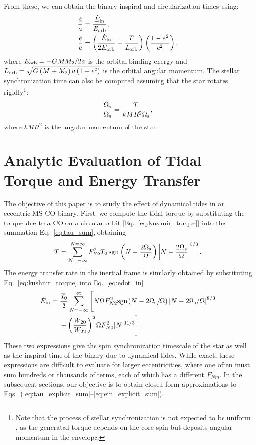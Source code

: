 \documentclass[
        fleqn,
        usenatbib,
    ]{mnras}
\newcommand*{\p}[1]{\left(#1\right)}
\begin{document}
From these, we can obtain the binary inspiral and circularization times using:
\begin{align}
    \frac{\dot{a}}{a} &= \frac{\dot{E}_{\rm in}}{E_{\rm orb}},
        \label{eq:dota}\\
    \frac{\dot{e}}{e} &= \p{\frac{\dot{E}_{\rm in}}{2E_{\rm orb}} +
        \frac{T}{L_{\rm orb}}} \p{\frac{1 - e^2}{e^2}}.
\end{align}
where $E_{\rm orb} = -GMM_2 / 2a$ is the orbital binding energy and $L_{\rm orb}
= \sqrt{G\p{M + M_2}a\p{1 - e^2}}$ is the orbital angular momentum. The stellar
synchronization time can also be computed assuming that the star rotates
rigidly\footnote{Note that the process of stellar synchronization is not
expected to be uniform \citep{goldreich1989tidal, su2020}, as the generated
torque depends on the core spin but deposits angular momentum in the envelope.}:
\begin{equation}
    \frac{\dot{\Omega}_{\rm s}}{\Omega_{\rm s}}
        = \frac{T}{kMR^2 \Omega_{\rm s}},
\end{equation}
where $kMR^2$ is the angular momentum of the star.

\section{Analytic Evaluation of Tidal Torque and Energy Transfer}\label{ss:objective}

The objective of this paper is to study the effect of dynamical tides in an
eccentric MS-CO binary. First, we compute the tidal torque by substituting the
torque due to a CO on a circular orbit [Eq.~\eqref{eq:kushnir_torque}] into the
summation Eq.~\eqref{eq:tau_sum}, obtaining
\begin{equation}
    T = \sum_{N = -\infty}^{N = \infty} F_{N2}^2 T_0
        \,\mathrm{sgn}\left(N - \frac{2\Omega_{\rm s}}{ \Omega}\right) \left|N -
        \frac{2 \Omega_{\rm s}}{\Omega}\right|^{8/3}.\label{eq:tau_explicit_sum}
\end{equation}
The energy transfer rate in the inertial frame is similarly obtained by
substituting Eq.~\eqref{eq:kushnir_torque} into Eq.~\eqref{eq:edot_in}
\begin{align}
    \dot{E}_{\rm in} ={}& \frac{T_0}{2}
        \sum_{N = -\infty}^{\infty} \Bigg[
            N\Omega F_{N2}^2 \mathrm{sgn}\left(N - 2\Omega_{\rm s} / \Omega\right)
                    \left|N - 2 \Omega_{\rm s} / \Omega\right|^{8/3}\nonumber\\
            &+ \left(\frac{W_{20}}{W_{22}}\right)^2 \Omega
                    F_{N0}^2 |N|^{11/3}
            \Bigg].\label{eq:ein_explicit_sum}
\end{align}
These two expressions give the spin synchronization timescale of the star as
well as the inspiral time of the binary due to dynamical tides. While exact,
these expressions are difficult to evaluate for larger eccentricities, where one
often must sum hundreds or thousands of terms, each of which has a different
$F_{Nm}$. In the subsequent sections, our objective is to obtain closed-form
approximations to Eqs.~(\ref{eq:tau_explicit_sum}--\ref{eq:ein_explicit_sum}).
\end{document}

